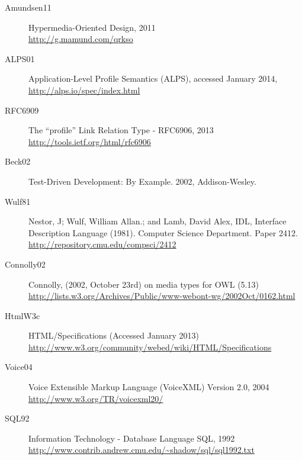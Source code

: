 \documentclass{wsrest2014}
\begin{document}
\begin{description}
 \item[Amundsen11] \label{Amundsen11}\hypertarget{Amundsen11}{} Hypermedia-Oriented Design, 2011 \\\href{http://g.mamund.com/qrkso}{http://g.mamund.com/qrkso}


 \item[ALPS01] \label{ALPS01}\hypertarget{ALPS01}{} Application-Level Profile Semantics (ALPS), accessed January 2014, \\\href{http://alps.io/spec/index.html}{http://alps.io/spec/index.html}


 \item[RFC6909] \label{RFC6909}\hypertarget{RFC6909}{} The ``profile'' Link Relation Type - RFC6906, 2013 \\\href{http://tools.ietf.org/html/rfc6906}{http://tools.ietf.org/html/rfc6906}


 \item[Beck02] \label{Beck02}\hypertarget{Beck02}{} Test-Driven Development: By Example. 2002, Addison-Wesley.


 \item[Wulf81] \label{Wulf81}\hypertarget{Wulf81}{} Nestor, J; Wulf, William Allan.; and Lamb, David Alex, \textquotedbl{}IDL, Interface Description Language\textquotedbl{} (1981). Computer Science Department. Paper 2412. \\\href{http://repository.cmu.edu/compsci/2412}{http://repository.cmu.edu/compsci/2412}


 \item[Connolly02] \label{Connolly02}\hypertarget{Connolly02}{} Connolly, (2002, October 23rd) \textquotedbl{}on media types for OWL (5.13)\textquotedbl{} \\\href{http://lists.w3.org/Archives/Public/www-webont-wg/2002Oct/0162.html}{http://lists.w3.org/Archives/Public/www-webont-wg/2002Oct/0162.html}


 \item[HtmlW3c] \label{HtmlW3c}\hypertarget{HtmlW3c}{} HTML/Specifications (Accessed January 2013) \\\href{http://www.w3.org/community/webed/wiki/HTML/Specifications}{http://www.w3.org/community/webed/wiki/HTML/Specifications}


 \item[Voice04] \label{Voice04}\hypertarget{Voice04}{} Voice Extensible Markup Language (VoiceXML) Version 2.0, 2004 \\\href{http://www.w3.org/TR/voicexml20/}{http://www.w3.org/TR/voicexml20/}

 \item[SQL92] \label{SQL92}\hypertarget{SQL92}{} Information Technology - Database Language SQL, 1992 \\\href{http://www.contrib.andrew.cmu.edu/\textasciitilde{}shadow/sql/sql1992.txt}{http://www.contrib.andrew.cmu.edu/\textasciitilde{}shadow/sql/sql1992.txt}

 \end{description}
\label{footer}\hypertarget{footer}{}
\end{document}
